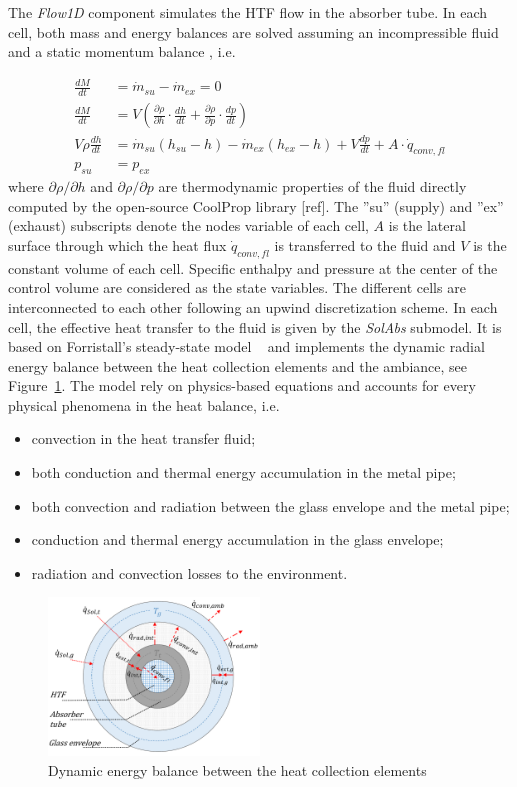 \documentclass[final,3p,times,review]{elsarticle}
\begin{document}
The \textit{Flow1D} component simulates the HTF flow in the absorber tube. In each cell, both mass and energy balances are solved assuming an incompressible fluid and a static momentum balance , i.e.

\begin{align}
\frac{dM}{dt} & = \dot{m}_{su}-\dot{m}_{ex} = 0 \\
\frac{dM}{dt} & = V \left( \frac{\partial \rho}{\partial h}  \cdot \frac{dh}{dt} + \frac{\partial \rho}{\partial p} \cdot \frac{dp}{dt} \right) \\
V\rho \frac{dh}{dt} & = \dot{m}_{su}(h_{su} - h) - \dot{m}_{ex}(h_{ex} - h) + V \frac{dp}{dt} + A \cdot \dot{q}_{conv,fl} \\
p_{su} & = p_{ex}
\end{align}
where $\partial \rho / \partial h$ and $\partial \rho / \partial p$ are thermodynamic properties of the fluid directly computed by the open-source CoolProp library [ref]. The ''su'' (supply) and ''ex'' (exhaust) subscripts denote the nodes variable of each cell, $A$ is the lateral surface through which the heat flux $\dot{q}_{conv,fl}$ is transferred to the fluid and $V$ is the constant volume of each cell. Specific enthalpy and pressure at the center of the control volume are considered as the state variables. The different cells are interconnected to each other following an upwind discretization scheme. In each cell, the effective heat transfer to the fluid is given by the \textit{SolAbs} submodel. It is based on Forristall's steady-state model ~\cite{Foristall2003} and implements the dynamic radial energy balance between the heat collection elements and the ambiance, see Figure~\ref{fig:Forristal_cs2}. The model rely on physics-based equations and accounts for every physical phenomena in the heat balance, i.e.
\begin{itemize}
\item convection in the heat transfer fluid;
\item both conduction and thermal energy accumulation in the metal pipe;
\item both convection and radiation between the glass envelope and the metal pipe;
\item conduction and thermal energy accumulation in the glass envelope;
\item radiation and convection losses to the environment.
\end{itemize}
%
\begin{figure}[h!]
\centering
\includegraphics[width=0.5\textwidth]{Figures/Forristal_cs2.pdf}
\caption{Dynamic energy balance between the heat collection elements}
\label{fig:Forristal_cs2}
\end{figure}
\end{document}

